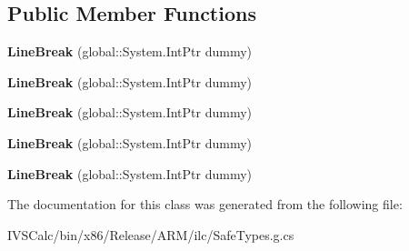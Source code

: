 \subsection*{Public Member Functions}
\begin{DoxyCompactItemize}
\item 
\mbox{\label{class_windows_1_1_u_i_1_1_xaml_1_1_documents_1_1_line_break_aa238a246c79e2ee31a991ed5cfa2feca}} 
{\bfseries Line\+Break} (global\+::\+System.\+Int\+Ptr dummy)
\item 
\mbox{\label{class_windows_1_1_u_i_1_1_xaml_1_1_documents_1_1_line_break_aa238a246c79e2ee31a991ed5cfa2feca}} 
{\bfseries Line\+Break} (global\+::\+System.\+Int\+Ptr dummy)
\item 
\mbox{\label{class_windows_1_1_u_i_1_1_xaml_1_1_documents_1_1_line_break_aa238a246c79e2ee31a991ed5cfa2feca}} 
{\bfseries Line\+Break} (global\+::\+System.\+Int\+Ptr dummy)
\item 
\mbox{\label{class_windows_1_1_u_i_1_1_xaml_1_1_documents_1_1_line_break_aa238a246c79e2ee31a991ed5cfa2feca}} 
{\bfseries Line\+Break} (global\+::\+System.\+Int\+Ptr dummy)
\item 
\mbox{\label{class_windows_1_1_u_i_1_1_xaml_1_1_documents_1_1_line_break_aa238a246c79e2ee31a991ed5cfa2feca}} 
{\bfseries Line\+Break} (global\+::\+System.\+Int\+Ptr dummy)
\end{DoxyCompactItemize}


The documentation for this class was generated from the following file\+:\begin{DoxyCompactItemize}
\item 
I\+V\+S\+Calc/bin/x86/\+Release/\+A\+R\+M/ilc/Safe\+Types.\+g.\+cs\end{DoxyCompactItemize}
